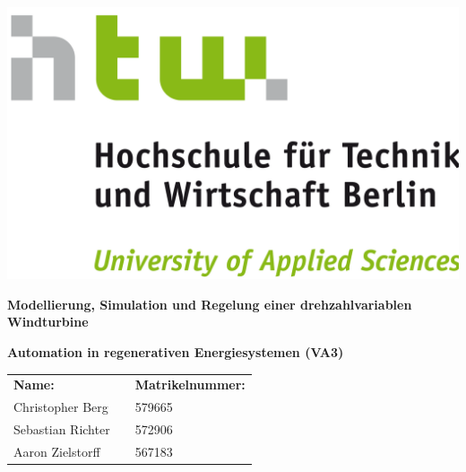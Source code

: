 \documentclass[
	pagesize,
	fontsize=12pt,
	paper=a4,
	oneside,
   reqno
]{scrartcl}
\numberwithin{equation}{section} %
\numberwithin{table}{section} %
\numberwithin{figure}{section} %
\begin{document}
\begin{titlepage}
   \pagestyle{empty} %

   \begin{flushright}
   \includegraphics[scale=.07]{Bilder/LogoHTWBerlin.png}  \nocite{HTWgross}
   \end{flushright}

   \vspace{1cm}

   \begin{center}
      \Huge{\textbf{Modellierung, Simulation und Regelung einer drehzahlvariablen Windturbine}} \\
   \end{center}
   
   \vspace{0.5cm}
   
   \begin{center}
      \Large{\textbf{Automation in regenerativen Energiesystemen (VA3)}} \\
   \end{center}

   \vspace{3cm}

   \begin{flushleft}
      \begin{tabular}{l c l }
         \textbf{Name: }&\hspace{1 cm} &\textbf{Matrikelnummer:} \\
         Christopher Berg   & & 579665 \\
         Sebastian Richter  & & 572906 \\
         Aaron Zielstorff   & & 567183 \\
      \end{tabular}
   \end{flushleft}


\end{titlepage}
\end{document}
